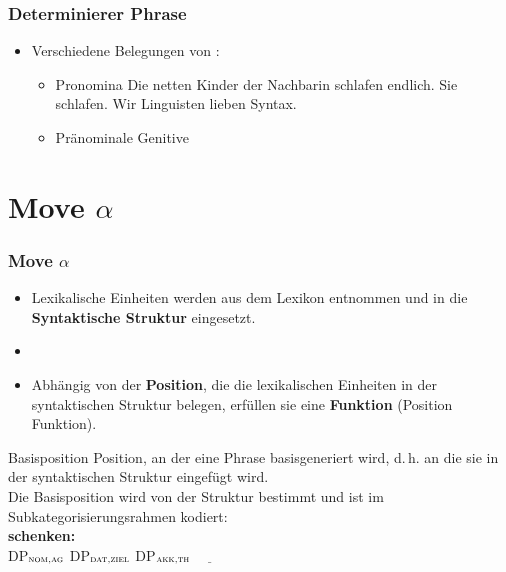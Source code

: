\begin{frame}
\frametitle{Determinierer Phrase}

\begin{itemize}
	\item Verschiedene Belegungen von :
	\begin{itemize}
		
		\item Pronomina
		\eal
		\ex \alert{Die netten Kinder der Nachbarin} schlafen endlich.
		\ex \alert{Sie} schlafen.
		\ex \alert{Wir Linguisten} lieben Syntax.
		\zl

\pause
		\item Pränominale Genitive
		\eal 
		\zl
		
	\end{itemize}
\end{itemize}

\end{frame}


\section{Move $\alpha$}


\begin{frame}
\frametitle{Move $\alpha$}

	\begin{itemize}
	\item Lexikalische Einheiten werden aus dem Lexikon entnommen und in die \textbf{Syntaktische Struktur} eingesetzt.
	\item[]
	\item Abhängig von der \textbf{Position}, die die lexikalischen Einheiten in der syntaktischen Struktur belegen, erfüllen sie eine \textbf{Funktion} (Position \ras Funktion).
	\end{itemize}

\begin{block}{Basisposition}
Position, an der eine Phrase basisgeneriert wird, d.\,h. an die sie in der syntaktischen Struktur eingefügt wird.\\
Die Basisposition wird von der Struktur bestimmt und ist im Subkategorisierungsrahmen kodiert:\\
\textbf{schenken:}\\
DP$_{\textsc{nom,ag}}$ DP$_{\textsc{dat,ziel}}$  DP$_{\textsc{akk,th}}$ $\underline{\qquad}$ 
\end{block}

\end{frame}

